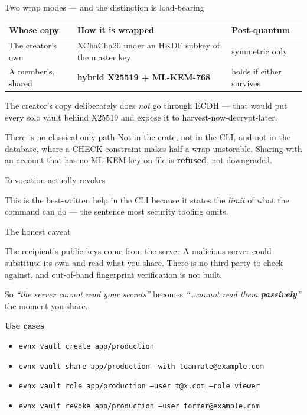 \begin{frame}{Two wrap modes — and the distinction is load-bearing}
  \begin{tabular}{@{}p{}p{}p{}@{}}
    \toprule
    \textbf{Whose copy} & \textbf{How it is wrapped} & \textbf{Post-quantum} \\
    \midrule
    The creator's own & XChaCha20 under an HKDF subkey of the master key & \evnxCheck{} symmetric only \\
    A member's, shared & \textbf{hybrid X25519 + ML-KEM-768} & \evnxCheck{} holds if either survives \\
    \bottomrule
  \end{tabular}

  \vspace{0.8em}
  The creator's copy deliberately does \emph{not} go through ECDH — that would
  put every solo vault behind X25519 and expose it to
  harvest-now-decrypt-later.

  \vspace{0.4em}
  \begin{block}{There is no classical-only path}
    Not in the crate, not in the CLI, and not in the database, where a CHECK
    constraint makes half a wrap unstorable. Sharing with an account that has no
    ML-KEM key on file is \textbf{refused}, not downgraded.
  \end{block}
\end{frame}

\begin{frame}[fragile]{Revocation actually revokes}

  {\footnotesize This is the best-written help in the CLI because it states the
  \emph{limit} of what the command can do — the sentence most security tooling
  omits.}
\end{frame}

\begin{frame}{The honest caveat}
  \begin{alertblock}{The recipient's public keys come from the server}
    A malicious server could substitute its own and read what you share. There
    is no third party to check against, and out-of-band fingerprint verification
    is not built.
  \end{alertblock}

  \vspace{0.6em}
  So \emph{``the server cannot read your secrets''} becomes \emph{``\ldots cannot
  read them \textbf{passively}''} the moment you share.

  \vspace{0.8em}
  \textbf{Use cases}
  \begin{itemize}\footnotesize
    \item \texttt{evnx vault create app/production}
    \item \texttt{evnx vault share app/production --with teammate@example.com}
    \item \texttt{evnx vault role app/production --user t@x.com --role viewer}
    \item \texttt{evnx vault revoke app/production --user former@example.com}
  \end{itemize}
\end{frame}
